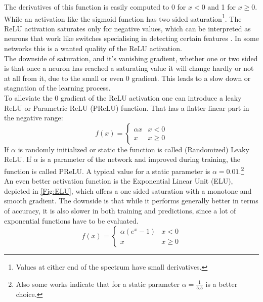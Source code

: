 				The derivatives of this function is easily computed to 0 for $ x < 0$ and 1 for $ x \geq 0$. While an activation like the sigmoid function has two sided saturation\footnote{Values at either end of the spectrum have small derivatives.}. The ReLU activation saturates only for negative values, which can be interpreted as neurons that work like switches specialising in detecting certain features . In some networks this is a wanted quality of the ReLU activation.\\
				The downside of saturation, and it's vanishing gradient, whether one or two sided is that once a neuron has reached a saturating value it will change hardly or not at all from it, due to the small or even 0 gradient. This leads to a slow down or stagnation of the learning process.\\
				To alleviate the 0 gradient of the ReLU activation one can introduce a leaky ReLU or Parametric ReLU (PReLU) function. That has a flatter linear part in the negative range:
				\begin{equation}
					f(x) =
					\begin{cases}
						\alpha x & x < 0\\
						x & x \geq 0
					\end{cases}
					\label{EQ:PReLU}
				\end{equation}
				If $\alpha$ is randomly initialized or static the function is called (Randomized) Leaky ReLU. If $\alpha$ is a parameter of the network and improved during training, the function is called PReLU. A typical value for a static parameter is $\alpha = 0.01$.\footnote{Also some works indicate that for a static parameter $\alpha = \frac{1}{5.5}$ is a better choice.} \\ %
				An even better activation function is the Exponential Linear Unit (ELU), depicted in \ref{Fig:ELU}, which offers a one sided saturation with a monotone and smooth gradient. The downside is that while it performs generally better in terms of accuracy, it is also slower in both training and predictions, since a lot of exponential functions have to be evaluated.\\
				\begin{equation}
				f(x) =
					\begin{cases}
						\alpha (e^x - 1) & x < 0 \\
						x & x \geq 0
					\end{cases}
				\end{equation}
